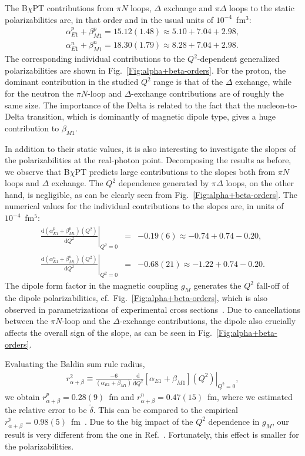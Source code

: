 \documentclass[11pt,preprint,tightenlines,
showpacs,preprintnumbers,amsmath,amssymb,superscriptaddress,a4paper,nofootinbib]{revtex4-1}
\def\bea{\begin{eqnarray}}
\def\eea{\end{eqnarray}}
\def\dd{\mathrm{d}}
\begin{document}
The B$\chi$PT contributions from $\pi N$ loops, $\Delta$ exchange and $\pi \Delta$ loops to the static polarizabilities are, in that order and in the usual units of $10^{-4}$~fm$^3$:
\begin{align}
\alpha_{E1}^p+\beta_{M1}^p=15.12(1.48) \approx 5.10+7.04+2.98, \label{Eq:alpha+betaProtonRealPoint}\\
\alpha_{E1}^n+\beta_{M1}^n =18.30(1.79)\approx 8.28+7.04+2.98. \label{Eq:alpha+betaNeutronRealPoint}
\end{align}
The corresponding individual contributions to the $Q^2$-dependent generalized polarizabilities are shown in Fig.~\ref{Fig:alpha+beta-orders}.
For the proton, the dominant contribution in the studied $Q^2$ range is that of the $\Delta$ exchange, while for the neutron the $\pi N$-loop and $\Delta$-exchange contributions are of roughly the same size.
The importance of the Delta is related to the fact that the nucleon-to-Delta transition, which is dominantly of magnetic dipole type, gives a huge contribution to $\beta_{M1}$. 




In addition to their static values, it is also interesting to investigate the slopes of the polarizabilities at the real-photon point. Decomposing the results as before, we observe that B$\chi$PT predicts large contributions to the slopes both from $\pi N$ loops and $\Delta$ exchange. The $Q^2$ dependence generated by $\pi \Delta$ loops, on the other hand, is negligible,
as can be clearly seen from Fig.~\ref{Fig:alpha+beta-orders}. The numerical values for the individual contributions to the slopes are, in units of $10^{-4}$~fm$^5$:
\bea
\left.\frac{\dd(\alpha_{E1}^p + \beta_{M1}^p) (Q^2)}{\dd Q^2}\right|_{Q^2=0}&=&-0.19(6)\approx -0.74  + 0.74-0.20 ,\\
\left.\frac{\dd(\alpha_{E1}^n + \beta_{M1}^n) (Q^2)}{\dd Q^2}\right|_{Q^2=0}&=& -0.68(21)\approx-1.22  +0.74-0.20.
\eea
 The dipole form factor in the magnetic coupling $g_M$ generates the $Q^2$ fall-off of the dipole polarizabilities, cf.\ Fig.~\ref{Fig:alpha+beta-orders}, which is also observed
in parametrizations of experimental cross sections~\cite{Hall:2014lea}. 
Due to cancellations between the $\pi N$-loop and the $\Delta$-exchange contributions,
 the dipole also crucially affects the overall sign of the slope, as can be seen in Fig.~\ref{Fig:alpha+beta-orders}.

Evaluating the Baldin sum rule radius, 
\begin{align}\label{Eq:r2alphabetaDef}
r_{\alpha+\beta}^2\equiv \frac{-6}{(\alpha_{E1}+\beta_{M1})}\left.\frac{\dd}{\dd Q^2}[\alpha_{E1}+\beta_{M1}](Q^2)\right|_{Q^2=0},
\end{align}
we obtain $r^p_{\alpha+\beta}= 0.28(9)$~fm and $r^n_{\alpha+\beta}=0.47(15)$~fm, 
where we estimated the relative error to be $\tilde{\delta}$. This can be compared to the empirical $r^p_{\alpha+\beta}=0.98(5)$~fm~\cite{Hall:2014lea}. Due to the big impact of the $Q^2$ dependence in $g_M$, our result is very different from the one in Ref.~\cite{Hall:2014lea}.
Fortunately, this effect is smaller for the polarizabilities.
\end{document}
